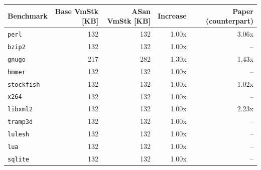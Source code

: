 \begin{tabular}{lrrrr}
\toprule
Benchmark & Base VmStk [KB] & ASan VmStk [KB] & Increase & Paper (counterpart) \\
\midrule
\texttt{perl} & 132 & 132 & 1.00x & 3.06x \\
\texttt{bzip2} & 132 & 132 & 1.00x & -- \\
\texttt{gnugo} & 217 & 282 & 1.30x & 1.43x \\
\texttt{hmmer} & 132 & 132 & 1.00x & -- \\
\texttt{stockfish} & 132 & 132 & 1.00x & 1.02x \\
\texttt{x264} & 132 & 132 & 1.00x & -- \\
\texttt{libxml2} & 132 & 132 & 1.00x & 2.23x \\
\texttt{tramp3d} & 132 & 132 & 1.00x & -- \\
\texttt{lulesh} & 132 & 132 & 1.00x & -- \\
\texttt{lua} & 132 & 132 & 1.00x & -- \\
\texttt{sqlite} & 132 & 132 & 1.00x & -- \\
\bottomrule
\end{tabular}
